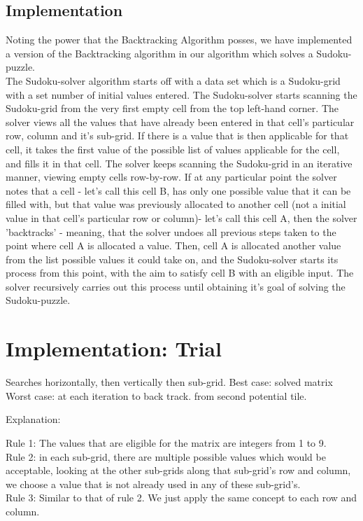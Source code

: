 \documentclass[12pt]{article}
\begin{document}
\subsection{Implementation}
Noting the power that the Backtracking Algorithm posses, we have implemented a version of the Backtracking algorithm in our algorithm which solves a Sudoku-puzzle.\\
The Sudoku-solver algorithm starts off with a data set which is a Sudoku-grid with a set number of initial values entered.%
The Sudoku-solver starts scanning the Sudoku-grid from the very first empty cell from the top left-hand corner. The solver views all the values that have already been entered in that cell's particular row, column and it's sub-grid. If there is a value that is then applicable for that cell, it takes the first value of the possible list of values applicable for the cell, and fills it in that cell. The solver keeps scanning the Sudoku-grid in an iterative manner, viewing empty cells row-by-row. If at any particular point the solver notes that a cell - let's call this cell B,  has only one possible value that it can be filled with, but that value was previously allocated to another cell %
(not a initial value in that cell's particular row or column)- let's call this cell A, then the solver 'backtracks' - meaning, that the solver undoes all previous steps taken to the point where cell A is allocated a value. Then, cell A is allocated another value from the list possible values it could take on, and the Sudoku-solver starts its process from this point, with the aim to satisfy cell B with an eligible input. The solver recursively carries out this process until obtaining it's goal of solving the Sudoku-puzzle.  


\section{Implementation: Trial}
\begin{flushleft}
Searches horizontally, then vertically then sub-grid. 
Best case: solved matrix
Worst case: at each iteration to back track. from second potential tile. 

\end{flushleft}

\begin{flushleft}
Explanation:
\end{flushleft}  
Rule 1: The values that are  eligible for the matrix are integers from 1 to 9.\\
Rule 2: in each sub-grid, there are multiple possible values which would be acceptable, looking at the other sub-grids along that sub-grid's row and column, we choose a value that is not already used in any of these sub-grid's. \\
Rule 3: Similar to that of rule 2. We just apply the same concept to each row and column. 
\end{document}

